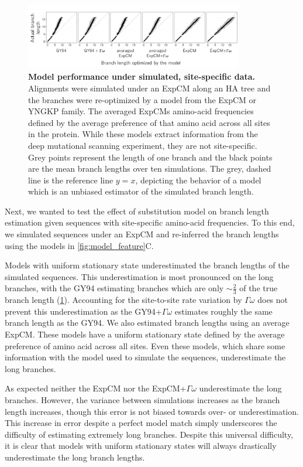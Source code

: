 \documentclass[11pt]{article}
\begin{document}
\begin{figure}[H]
\centerline{\includegraphics[width=0.85\textwidth]{figures/simulations}}
\caption{\label{fig:simulations}
\textbf{Model performance under simulated, site-specific data.} 
Alignments were simulated under an ExpCM along an HA tree and the branches were re-optimized by a model from the ExpCM or YNGKP family. 
The averaged ExpCMs amino-acid frequencies defined by the average preference of that amino acid across all sites in the protein. 
While these models extract information from the deep mutational scanning experiment, they are not site-specific. 
Grey points represent the length of one branch and the black points are the mean branch lengths over ten simulations. 
The grey, dashed line is the reference line $y=x$, depicting the behavior of a model which is an unbiased estimator of the simulated branch length. 
}
\end{figure}

Next, we wanted to test the effect of substitution model on branch length estimation given sequences with site-specific amino-acid frequencies. 
To this end, we simulated sequences under an ExpCM and re-inferred the branch lengths using the models  in \ref{fig:model_feature}C. 

Models with uniform stationary state underestimated the branch lengths of the simulated sequences. 
This underestimation is most pronounced on the long branches, with the GY94 estimating branches which are only $\sim \frac{2}{3}$ of the true branch length (\ref{fig:simulations}).
Accounting for the site-to-site rate variation by $\Gamma\omega$ does not prevent this underestimation as the GY94+$\Gamma\omega$ estimates roughly the same branch length as the GY94. 
We also estimated branch lengths using an average ExpCM. 
These models have a uniform stationary state defined by the average preference of amino acid across all sites. 
Even these models, which share some information with the model used to simulate the sequences, underestimate the long branches. 

As expected neither the ExpCM nor the ExpCM+$\Gamma\omega$ underestimate the long branches. 
However, the variance between simulations increases as the branch length increases, though this error is not biased towards over- or underestimation. 
This increase in error despite a perfect model match simply underscores the difficulty of estimating extremely long branches. 
Despite this universal difficulty, it is clear that models with uniform stationary states will always drastically underestimate the long branch lengths. 
\end{document}

